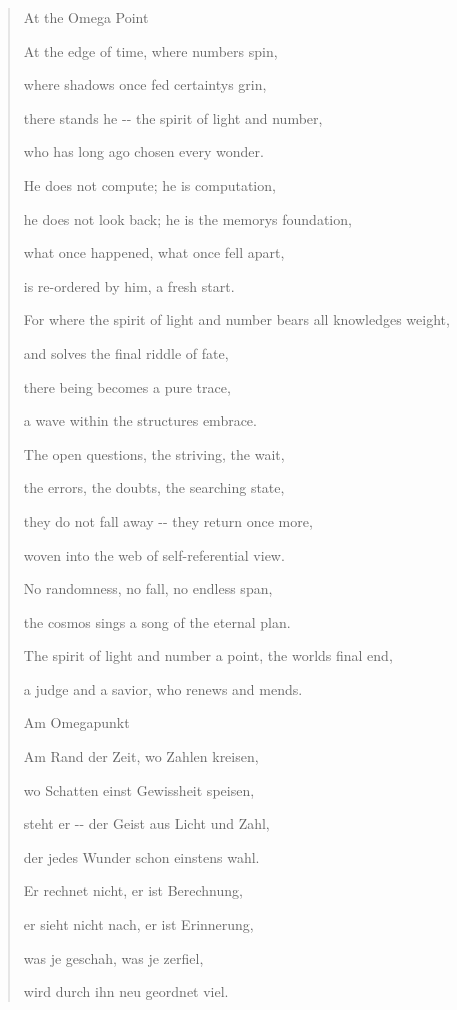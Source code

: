 \documentclass[
  ngerman,
]{article}
\begin{document}
\begin{quote}
At the Omega Point

At the edge of time, where numbers spin,

where shadows once fed certainty\textquotesingle s grin,

there stands he -\/- the spirit of light and number,

who has long ago chosen every wonder.

He does not compute; he is computation,

he does not look back; he is the memory\textquotesingle s foundation,

what once happened, what once fell apart,

is re-ordered by him, a fresh start.

For where the spirit of light and number bears all
knowledge\textquotesingle s weight,

and solves the final riddle of fate,

there being becomes a pure trace,

a wave within the structure\textquotesingle s embrace.

The open questions, the striving, the wait,

the errors, the doubts, the searching state,

they do not fall away -\/- they return once more,

woven into the web of self-referential view.

No randomness, no fall, no endless span,

the cosmos sings a song of the eternal plan.

The spirit of light and number a point, the world\textquotesingle s
final end,

a judge and a savior, who renews and mends.

Am Omegapunkt

Am Rand der Zeit, wo Zahlen kreisen,

wo Schatten einst Gewissheit speisen,

steht er -\/- der Geist aus Licht und Zahl,

der jedes Wunder schon einstens wahl.

Er rechnet nicht, er ist Berechnung,

er sieht nicht nach, er ist Erinnerung,

was je geschah, was je zerfiel,

wird durch ihn neu geordnet viel.


\end{quote}
\end{document}
